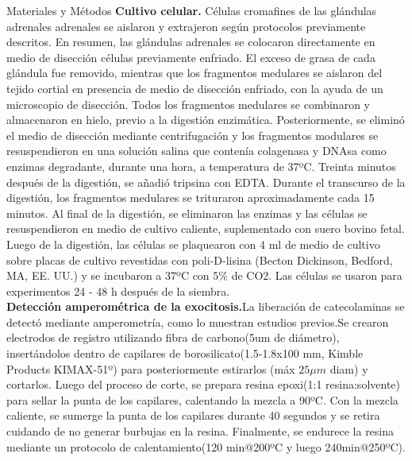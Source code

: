 \documentclass[twocolumn]{article}
\makeatletter
\def\section{\@startsection {section}{1}{\z@}{24pt plus 2pt minus 2pt}
{12pt plus 2pt minus 2pt}{\large\bf}}
\makeatother
\begin{document}
\section{Materiales y Métodos}
{\bf Cultivo celular.}
Células cromafines de las glándulas adrenales adrenales se aislaron y extrajeron según protocolos previamente descritos\citep{colliver2000quantitative,gonzalez2010association,dominguez2012preparation}.  En resumen, las glándulas adrenales se colocaron directamente en medio de disección células previamente enfriado.  El exceso de grasa de cada glándula fue removido, mientras que los fragmentos medulares se aislaron del tejido cortial en presencia de medio de disección enfriado, con la ayuda de un microscopio de disección.  Todos los fragmentos medulares  se combinaron y almacenaron en hielo, previo a la digestión enzimática.  Posteriormente, se eliminó el medio de disección mediante centrifugación y los fragmentos modulares se resuspendieron en una solución salina que contenía colagenasa y DNAsa como enzimas degradante, durante una hora, a temperatura de 37ºC.  Treinta minutos después de la digestión, se añadió tripsina con EDTA.  Durante el transcurso de la digestión, los fragmentos medulares se trituraron aproximadamente cada 15 minutos.  Al final de la digestión, se eliminaron las enzimas y las células se resuspendieron en medio de cultivo caliente, suplementado con suero bovino fetal.
Luego de la digestión, las células se plaquearon con 4 ml de medio de cultivo sobre placas de cultivo revestidas con poli-D-lisina (Becton Dickinson, Bedford, MA, EE. UU.) y se incubaron a 37ºC con 5\% de CO2. Las células se usaron para experimentos 24 - 48 h después de la siembra.\\
{\bf Detección amperométrica de la exocitosis.}La liberación de catecolaminas se detectó mediante amperometría, como lo muestran estudios previos\citep{gonzalez2010association,evanko2005primer,leszczyszyn1991secretion,wightman1991temporally}.Se crearon electrodos de registro utilizando fibra de carbono(5um de diámetro), insertándolos dentro de capilares de borosilicato(1.5-1.8x100 mm, Kimble Products KIMAX-51º) para posteriormente estirarlos (máx $25\mu m$ diam) y cortarlos.  Luego del proceso de corte, se prepara resina epoxi(1:1 resina:solvente) para sellar la punta de los capilares, calentando la mezcla a 90ºC.  Con la mezcla caliente, se sumerge la punta de los capilares durante 40 segundos y se retira cuidando de no generar burbujas en la resina.  Finalmente, se endurece la resina mediante un protocolo de calentamiento(120 min@200ºC y luego 240min@250ºC).
\end{document}
